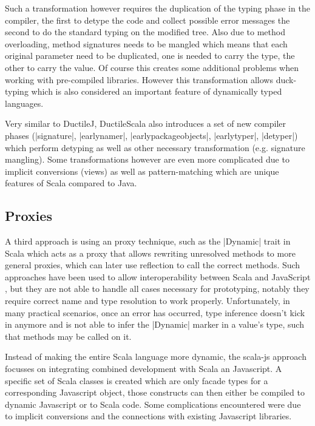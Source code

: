 Such a transformation however requires the duplication of the typing phase in the compiler, the first to detype the code and collect possible error messages the second to do the standard typing on the modified tree. Also due to method overloading, method signatures needs to be mangled which means that each original parameter need to be duplicated, one is needed to carry the type, the other to carry the value. Of course this creates some additional problems when working with pre-compiled libraries. However this transformation allows duck-typing which is also considered an important feature of dynamically typed languages.

Very similar to DuctileJ, DuctileScala \cite{ductilescala} also introduces a set of new compiler phases (|signature|, |earlynamer|, |earlypackageobjects|, |earlytyper|, |detyper|) which perform detyping as well as other necessary transformation (e.g. signature mangling). Some transformations however are even more complicated due to implicit conversions (views) as well as pattern-matching which are unique features of Scala compared to Java.

\subsection{Proxies}

A third approach is using an proxy technique, such as the |Dynamic| trait in Scala \cite{dynamic} which acts as a proxy that allows rewriting unresolved methods to more general proxies, which can later use reflection to call the correct methods. Such approaches have been used to allow interoperability between Scala and JavaScript \cite{scala-js}, but they are not able to handle all cases necessary for prototyping, notably they require correct name and type resolution to work properly. Unfortunately, in many practical scenarios, once an error has occurred, type inference doesn't kick in anymore and is not able to infer the |Dynamic| marker in a value's type, such that methods may be called on it.

Instead of making the entire Scala language more dynamic, the scala-js approach \cite{scala-js} focusses on integrating combined development with Scala an Javascript. A specific set of Scala classes is created which are only facade types for a corresponding Javascript object, those constructs can then either be compiled to dynamic Javascript or to Scala code. Some complications encountered were due to implicit conversions and the connections with existing Javascript libraries.

